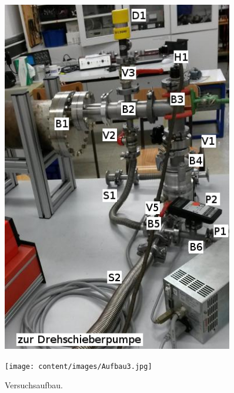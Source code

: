 \begin{figure}
\begin{minipage}{0.5\textwidth}
	\centering
	\includegraphics[width=0.9\textwidth,keepaspectratio]{content/images/Aufbau2.jpg}
\end{minipage}
\begin{minipage}{0.5\textwidth}
	\centering
	\texttt{[image: content/images/Aufbau3.jpg]}
\end{minipage}
\caption{Versuchsaufbau.}
\label{fig:Aufbau}
\end{figure}

